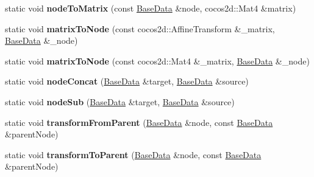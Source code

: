 \begin{DoxyCompactItemize}
\item 
\mbox{\label{classcocostudio_1_1TransformHelp_ad5b5773799a1db6e3c66c9d9bb96fde7}} 
static void {\bfseries node\+To\+Matrix} (const \hyperlink{classcocostudio_1_1BaseData}{Base\+Data} \&node, cocos2d\+::\+Mat4 \&matrix)
\item 
\mbox{\label{classcocostudio_1_1TransformHelp_a4ba91cbe8cf6d973ca702a2c361d1585}} 
static void {\bfseries matrix\+To\+Node} (const cocos2d\+::\+Affine\+Transform \&\+\_\+matrix, \hyperlink{classcocostudio_1_1BaseData}{Base\+Data} \&\+\_\+node)
\item 
\mbox{\label{classcocostudio_1_1TransformHelp_a4e55ad87d43ec7a7941ac0d8ec379fde}} 
static void {\bfseries matrix\+To\+Node} (const cocos2d\+::\+Mat4 \&\+\_\+matrix, \hyperlink{classcocostudio_1_1BaseData}{Base\+Data} \&\+\_\+node)
\item 
\mbox{\label{classcocostudio_1_1TransformHelp_a242cf02c84484ce775e0f62e9b266ab0}} 
static void {\bfseries node\+Concat} (\hyperlink{classcocostudio_1_1BaseData}{Base\+Data} \&target, \hyperlink{classcocostudio_1_1BaseData}{Base\+Data} \&source)
\item 
\mbox{\label{classcocostudio_1_1TransformHelp_aeaec68e516cfe1615757e26bbddffc80}} 
static void {\bfseries node\+Sub} (\hyperlink{classcocostudio_1_1BaseData}{Base\+Data} \&target, \hyperlink{classcocostudio_1_1BaseData}{Base\+Data} \&source)
\item 
\mbox{\label{classcocostudio_1_1TransformHelp_a98aa682beb92feda90865642d097fd7b}} 
static void {\bfseries transform\+From\+Parent} (\hyperlink{classcocostudio_1_1BaseData}{Base\+Data} \&node, const \hyperlink{classcocostudio_1_1BaseData}{Base\+Data} \&parent\+Node)
\item 
\mbox{\label{classcocostudio_1_1TransformHelp_ac07a51529c1d6971e89cea6b8136a497}} 
static void {\bfseries transform\+To\+Parent} (\hyperlink{classcocostudio_1_1BaseData}{Base\+Data} \&node, const \hyperlink{classcocostudio_1_1BaseData}{Base\+Data} \&parent\+Node)

\end{DoxyCompactItemize}
